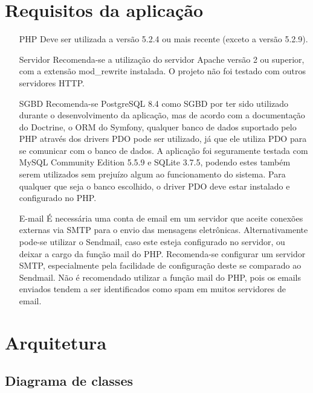 \section{Requisitos da aplicação}

\begin{itemize}
\item[PHP] Deve ser utilizada a versão 5.2.4 ou mais recente (exceto a versão 5.2.9).
\item[Servidor] Recomenda-se a utilização do servidor Apache versão 2 ou superior, com a extensão
mod\_rewrite instalada. O projeto não foi testado com outros servidores HTTP.
\item[SGBD] Recomenda-se PostgreSQL 8.4 como SGBD por ter sido utilizado durante o desenvolvimento da aplicação, mas
de acordo com a documentação do Doctrine, o ORM do Symfony, qualquer banco de dados suportado pelo PHP através 
dos drivers PDO pode ser utilizado, já que ele utiliza PDO para se comunicar com o banco de dados.
A aplicação foi seguramente testada com MySQL Community Edition 5.5.9 e SQLite 3.7.5, podendo estes 
também serem utilizados sem prejuízo algum ao funcionamento do sistema. Para qualquer que seja o
banco escolhido, o driver PDO deve estar instalado e configurado no PHP.
\item[E-mail] É necessária uma conta de email em um servidor que aceite conexões externas via SMTP para
o envio das mensagens eletrônicas. Alternativamente pode-se utilizar o Sendmail, caso este esteja
configurado no servidor, ou deixar a cargo da função mail do PHP. Recomenda-se configurar um
servidor SMTP, especialmente pela facilidade de configuração deste se comparado ao Sendmail. Não 
é recomendado utilizar a função mail do PHP, pois os emails enviados tendem a ser identificados
como spam em muitos servidores de email.


\end{itemize}



\section{Arquitetura}
\subsection{Diagrama de classes}
